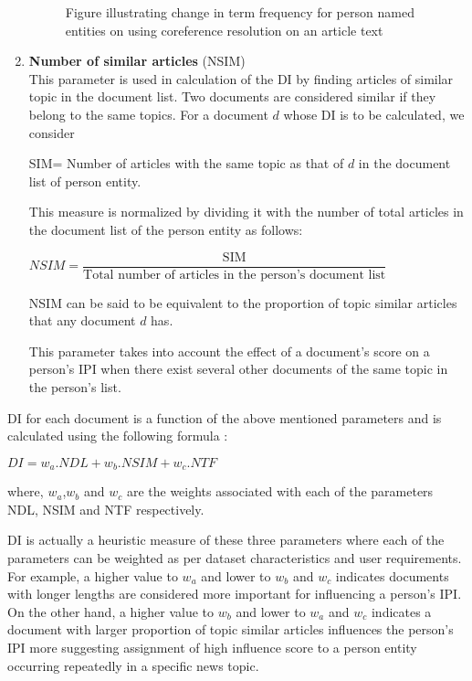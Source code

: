 \begin{enumerate}
\begin{figure*}
\caption{Figure illustrating change in term frequency for person named entities on using coreference resolution on an article text}
\label{figure:coref}
\end{figure*}

\item \textbf{Number of similar articles} (NSIM)\\
This parameter is used in calculation of the DI by finding articles of similar topic in the document list. 
Two documents are considered similar if they belong to the same topics. For a document $d$ whose DI is to be calculated, we consider 

SIM= Number of articles with the same topic as that of $d$ in the document list of person entity.

This measure is normalized by dividing it with the number of total articles in the document list of the person entity as follows:

\begin{center}
$NSIM= \dfrac{\text{SIM}} {\text{Total number of articles in the person's document list}}$
\end{center}
NSIM can be said to be equivalent to the proportion of topic similar articles that any document $d$ has.

This parameter takes into account the effect of a document's score on a person's IPI when there exist several other documents of the same topic in the person's list. 


\end{enumerate}

DI for each document is a function of the above mentioned parameters and is calculated using the following formula :
\begin{center}

			$DI = w_a . NDL + w_b . NSIM + w_c . NTF $
\end{center}
where, $w_a$,$ w_b$ and $w_c$ are the weights associated with each of the parameters NDL, NSIM and NTF respectively.


DI is actually a heuristic measure of these three parameters where each of the parameters can be weighted as per dataset characteristics and user requirements. For example, a higher value to $w_a$ and lower to $w_b$ and $w_c$ indicates documents with longer lengths are considered more important for influencing a person's IPI. On the other hand, a higher value to $w_b$ and lower to $w_a$ and $w_c$ indicates a document with larger proportion of topic similar articles influences the person's IPI more suggesting assignment of high influence score to a person entity occurring repeatedly in a specific news topic.  

